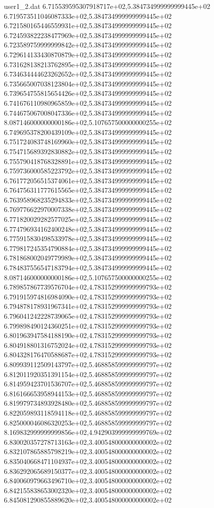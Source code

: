 \begin{filecontents}{user1_2.dat}
6.715539595307918717e+02,5.384734999999999445e+02
6.719573511046087333e+02,5.384734999999999445e+02
6.721580165446559931e+02,5.384734999999999445e+02
6.724593822238477969e+02,5.384734999999999445e+02
6.723589759999999842e+02,5.384734999999999445e+02
6.729614133430870879e+02,5.384734999999999445e+02
6.731628138213762895e+02,5.384734999999999445e+02
6.734634444623262652e+02,5.384734999999999445e+02
6.735665007038123804e+02,5.384734999999999445e+02
6.739654755815654426e+02,5.384734999999999445e+02
6.741676110980965859e+02,5.384734999999999445e+02
6.744675067008047336e+02,5.384734999999999445e+02
8.087146000000000186e+02,5.107657500000000255e+02
6.749695378200439109e+02,5.384734999999999445e+02
6.751724083748169960e+02,5.384734999999999445e+02
6.754715689392830882e+02,5.384734999999999445e+02
6.755790418768328891e+02,5.384734999999999445e+02
6.759736000585223792e+02,5.384734999999999445e+02
6.761772056515374061e+02,5.384734999999999445e+02
6.764756311777615565e+02,5.384734999999999445e+02
6.763958968235294833e+02,5.384734999999999445e+02
6.769776622970007338e+02,5.384734999999999445e+02
6.771820029282577025e+02,5.384734999999999445e+02
6.774796934162400248e+02,5.384734999999999445e+02
6.775915830498533978e+02,5.384734999999999445e+02
6.779817245354790884e+02,5.384734999999999445e+02
6.781868002049779989e+02,5.384734999999999445e+02
6.784837556547183794e+02,5.384734999999999445e+02
8.087146000000000186e+02,5.107657500000000255e+02
6.789857867739576704e+02,4.783152999999999793e+02
6.791915974816984090e+02,4.783152999999999793e+02
6.794878178931967341e+02,4.783152999999999793e+02
6.796041242228739065e+02,4.783152999999999793e+02
6.799898490124360251e+02,4.783152999999999793e+02
6.801963947584188190e+02,4.783152999999999793e+02
6.804918801316752024e+02,4.783152999999999793e+02
6.804328176470588687e+02,4.783152999999999793e+02
6.809939112509143797e+02,5.468858599999999797e+02
6.812011920351391154e+02,5.468858599999999797e+02
6.814959423701536707e+02,5.468858599999999797e+02
6.816166653958944153e+02,5.468858599999999797e+02
6.819979734893928480e+02,5.468858599999999797e+02
6.822059893118594118e+02,5.468858599999999797e+02
6.825000046086320253e+02,5.468858599999999797e+02
8.169832999999999856e+02,4.942903999999999769e+02
6.830020357278713163e+02,3.400548000000000002e+02
6.832107865885798219e+02,3.400548000000000002e+02
6.835040668471104937e+02,3.400548000000000002e+02
6.836292065689150377e+02,3.400548000000000002e+02
6.840060979663496710e+02,3.400548000000000002e+02
6.842155838653002320e+02,3.400548000000000002e+02
6.845081290855889620e+02,3.400548000000000002e+02

\end{filecontents}
